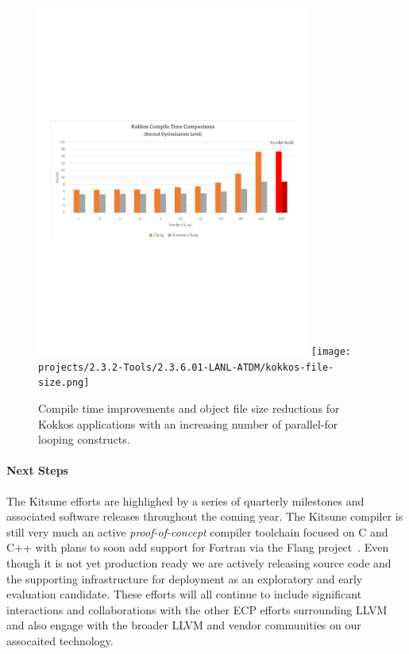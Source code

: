 \begin{figure}
  \includegraphics[width=0.8\textwidth]{projects/2.3.6-NNSA/2.3.6.01-LANL-ATDM/kokkos-compile-times.png}
  \texttt{[image: projects/2.3.2-Tools/2.3.6.01-LANL-ATDM/kokkos-file-size.png]}
  \caption{Compile time improvements and object file size reductions for
           Kokkos applications with an increasing number of parallel-for
           looping constructs.}
  \label{fig:2.3.2.02:time_size}                      
\end{figure}


\paragraph{Next Steps}
The Kitsune efforts are highlighed by a series of quarterly milestones
and associated software releases throughout the coming year.  The
Kitsune compiler is still very much an active \emph{proof-of-concept}
compiler toolchain focused on C and C++ with plans to soon add support
for Fortran via the Flang project~\cite{Flang:2018}.  Even though it
is not yet production ready we are actively releasing source code and
the supporting infrastructure for deployment as an exploratory and
early evaluation candidate.  These efforts will all continue to
include significant interactions and collaborations with the other ECP
efforts surrounding LLVM and also engage with the broader LLVM and
vendor communities on our assocaited technology.
